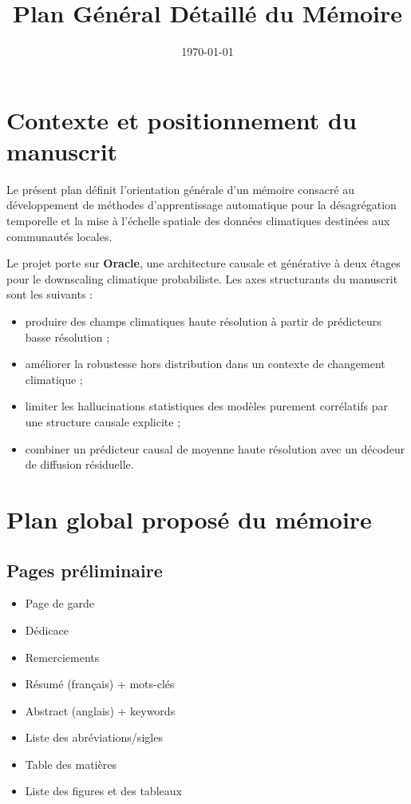 \documentclass[12pt,a4paper]{article}
\title{Plan G\'en\'eral D\'etaill\'e du M\'emoire}
\author{}
\date{\today}
\begin{document}
\maketitle

\section{Contexte et positionnement du manuscrit}

Le pr\'esent plan d\'efinit l'orientation g\'en\'erale d'un m\'emoire consacr\'e au d\'eveloppement de m\'ethodes d'apprentissage automatique pour la d\'esagr\'egation temporelle et la mise \`a l'\'echelle spatiale des donn\'ees climatiques destin\'ees aux communaut\'es locales.

Le projet porte sur \textbf{Oracle}, une architecture causale et g\'en\'erative \`a deux \'etages pour le downscaling climatique probabiliste. Les axes structurants du manuscrit sont les suivants :
\begin{itemize}
    \item produire des champs climatiques haute r\'esolution \`a partir de pr\'edicteurs basse r\'esolution ;
    \item am\'eliorer la robustesse hors distribution dans un contexte de changement climatique ;
    \item limiter les hallucinations statistiques des mod\`eles purement corr\'elatifs par une structure causale explicite ;
    \item combiner un pr\'edicteur causal de moyenne haute r\'esolution avec un d\'ecodeur de diffusion r\'esiduelle.
\end{itemize}

\section{Plan global propos\'e du m\'emoire}

\subsection*{Pages pr\'eliminaire}
\begin{itemize}
    \item Page de garde
    \item D\'edicace
    \item Remerciements
    \item R\'esum\'e (fran\c{c}ais) + mots-cl\'es
    \item Abstract (anglais) + keywords
    \item Liste des abr\'eviations/sigles
    \item Table des mati\`eres
    \item Liste des figures et des tableaux
\end{itemize}
\end{document}
